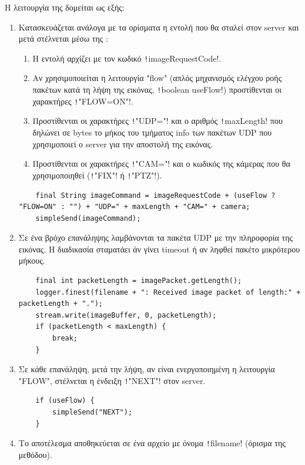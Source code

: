 Η λειτουργία της δομείται ως εξής:
\begin{enumerate}
    \item Κατασκευάζεται ανάλογα με τα ορίσματα η εντολή που θα σταλεί στον server και μετά στέλνεται μέσω της :
    \begin{enumerate}
        \item Η εντολή αρχίζει με τον κωδικό \texttt!imageRequestCode!.

        \item Αν χρησιμοποιείται η λειτουργία "flow" (απλός μηχανισμός ελέγχου ροής πακέτων κατά τη λήψη της εικόνας, \texttt!boolean useFlow!) προστίθενται οι χαρακτήρες \texttt!"FLOW=ON"!.

        \item Προστίθενται οι χαρακτήρες \texttt!"UDP="! και ο αριθμός \texttt!maxLength!
        που δηλώνει σε bytes το μήκος του τμήματος info των πακέτων UDP που χρησιμοποιεί ο server για την αποστολή της εικόνας.

        \item Προστίθενται οι χαρακτήρες \texttt!"CAM="! και ο κωδικός της κάμερας που θα χρησιμοποιηθεί (\texttt!"FIX"! ή \texttt!"PTZ"!).
    \end{enumerate}
    \begin{verbatim}
    final String imageCommand = imageRequestCode + (useFlow ? "FLOW=ON" : "") + "UDP=" + maxLength + "CAM=" + camera;
    simpleSend(imageCommand);
    \end{verbatim}

    \item Σε ένα βρόχο επανάληψης λαμβάνονται τα πακέτα UDP με την πληροφορία της εικόνας. Η διαδικασία σταματάει άν γίνει timeout ή αν ληφθεί πακέτο μικρότερου μήκους.
    \begin{verbatim}
    final int packetLength = imagePacket.getLength();
    logger.finest(filename + ": Received image packet of length:" + packetLength + ".");
    stream.write(imageBuffer, 0, packetLength);
    if (packetLength < maxLength) {
        break;
    }
    \end{verbatim}

    \item Σε κάθε επανάληψη, μετά την λήψη, αν είναι ενεργοποιημένη η λειτουργία "FLOW", στέλνεται η ένδειξη \texttt!"NEXT"! στον server.
    \begin{verbatim}
    if (useFlow) {
        simpleSend("NEXT");
    }
    \end{verbatim}

    \item Το αποτέλεσμα αποθηκεύεται σε ένα αρχείο με όνομα \texttt!filename! (όρισμα της μεθόδου).
\end{enumerate}
